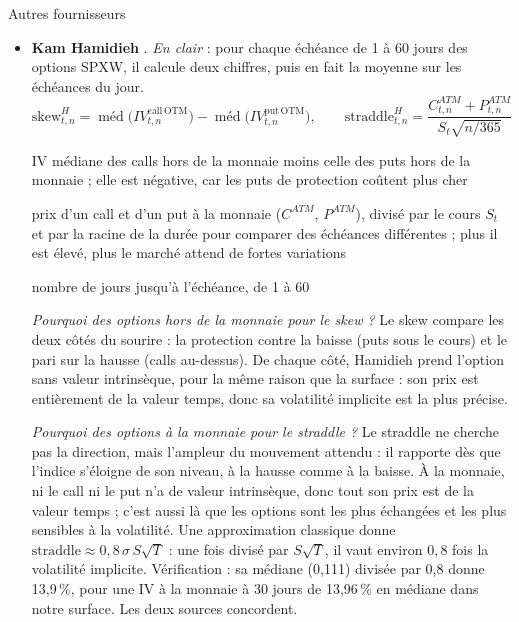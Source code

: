 \documentclass[10pt,a4paper]{article}
\newcommand{\notation}[2]{\makebox[2.3cm][l]{#1}\parbox[t]{\dimexpr\linewidth-2.3cm\relax}{#2}\par}
\begin{document}
\begin{fournisseur}{Autres fournisseurs}
\begin{itemize}
\begin{itemize}
  \item pour chaque échéance, ils tracent une courbe SVI qui passe au plus près de ces points, ce qui lisse le sourire. La courbe est seulement \emph{incitée}, pas obligée, à éviter les prix incohérents ;
  \item entre deux échéances, ils interpolent ; au-delà des échéances disponibles, ils recopient la dernière valeur connue ; une case encore vide prend la valeur de la case voisine.
  \end{itemize}
  Conséquence : une partie des 512 cases d'une journée (32 prix d'exercice × 16 échéances) est \emph{estimée}, et non observée.
\item \textbf{Kam Hamidieh} \cite{hamidieh}. \emph{En clair} : pour chaque échéance de 1 à 60 jours des options SPXW, il calcule deux chiffres, puis en fait la moyenne sur les échéances du jour.
  \begin{equation}\label{eq:hamidieh}
  \mathrm{skew}^{H}_{t,n}=\operatorname{méd}\bigl(IV^{\mathrm{call\,OTM}}_{t,n}\bigr)-\operatorname{méd}\bigl(IV^{\mathrm{put\,OTM}}_{t,n}\bigr),\qquad
  \mathrm{straddle}^{H}_{t,n}=\frac{C^{ATM}_{t,n}+P^{ATM}_{t,n}}{S_t\sqrt{n/365}}
  \end{equation}
  \notation{$\mathrm{skew}^{H}$}{IV médiane des calls hors de la monnaie moins celle des puts hors de la monnaie ; elle est négative, car les puts de protection coûtent plus cher}
  \notation{$\mathrm{straddle}^{H}$}{prix d'un call et d'un put à la monnaie ($C^{ATM}$, $P^{ATM}$), divisé par le cours $S_t$ et par la racine de la durée pour comparer des échéances différentes ; plus il est élevé, plus le marché attend de fortes variations}
  \notation{$n$}{nombre de jours jusqu'à l'échéance, de 1 à 60}
  \emph{Pourquoi des options hors de la monnaie pour le skew ?} Le skew compare les deux côtés du sourire : la protection contre la baisse (puts sous le cours) et le pari sur la hausse (calls au-dessus). De chaque côté, Hamidieh prend l'option sans valeur intrinsèque, pour la même raison que la surface : son prix est entièrement de la valeur temps, donc sa volatilité implicite est la plus précise.

  \emph{Pourquoi des options à la monnaie pour le straddle ?} Le straddle ne cherche pas la direction, mais l'ampleur du mouvement attendu : il rapporte dès que l'indice s'éloigne de son niveau, à la hausse comme à la baisse. À la monnaie, ni le call ni le put n'a de valeur intrinsèque, donc tout son prix est de la valeur temps ; c'est aussi là que les options sont les plus échangées et les plus sensibles à la volatilité. Une approximation classique donne $\text{straddle}\approx0{,}8\,\sigma\,S\sqrt{T}$ : une fois divisé par $S\sqrt{T}$, il vaut environ $0{,}8$ fois la volatilité implicite. Vérification : sa médiane (0,111) divisée par 0,8 donne 13,9\,\%, pour une IV à la monnaie à 30 jours de 13,96\,\% en médiane dans notre surface. Les deux sources concordent.


\end{itemize}
\end{fournisseur}
\end{document}
